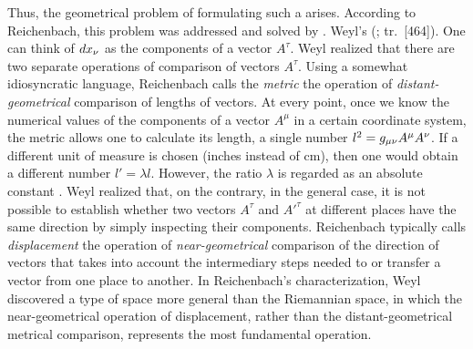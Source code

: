 \documentclass[submitted]{article}
\renewcommand{\rzlap}[2]{(\cite[#1]{Reichenbach1928}; tr.\ [#2])\xspace}
\begin{document}
Thus, the geometrical problem of formulating such a  arises. According to Reichenbach, this problem was addressed and solved by \citet{Weyl1918a,Weyl1918b}. Weyl's  \rzlap{333}{464}. One can think of $dx_{\nu}$ as the components of a vector $A^\tau$. Weyl realized that there are two separate operations of comparison of vectors $A^\tau$. Using a somewhat idiosyncratic language, Reichenbach calls the \emph{metric} the operation of \emph{distant-geometrical} comparison of lengths of vectors. At every point, once we know the numerical values of the components of a vector $A^\mu$ in a certain coordinate system, the metric \gmn allows one to calculate its length, a single number $l^2=g_{\mu\nu} A^\mu A^\nu$. If a different unit of measure is chosen (inches instead of cm), then one would obtain a different number $l'=\lambda l$. However, the ratio $\lambda$ is regarded as an absolute constant \citep[see][102]{Weyl1919a}. Weyl realized that, on the contrary, in the general case, it is not possible to establish whether two vectors $A^\tau$ and $A'^\tau$ at different places have the same direction by simply inspecting their components. Reichenbach typically calls \emph{displacement} the operation of \emph{near-geometrical} comparison of the direction of vectors that takes into account the intermediary steps needed to  or transfer a vector from one place to another. In Reichenbach's characterization, Weyl discovered a type of space more general than the Riemannian space, in which the near-geometrical operation of displacement, rather than the distant-geometrical metrical comparison, represents the most fundamental operation. 
 

\end{document}
